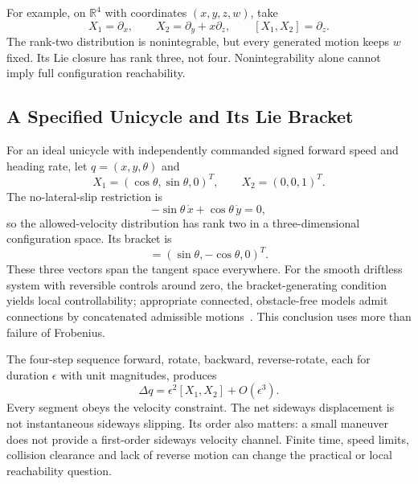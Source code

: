 For example, on $\mathbb R^4$ with coordinates $(x,y,z,w)$, take
\begin{equation}
 X_1=\partial_x,\qquad X_2=\partial_y+x\partial_z,
 \qquad[X_1,X_2]=\partial_z.
\end{equation}
The rank-two distribution is nonintegrable, but every generated motion keeps $w$ fixed. Its Lie closure has rank three, not four. Nonintegrability alone cannot imply full configuration reachability.

\subsection{A Specified Unicycle and Its Lie Bracket}

For an ideal unicycle with independently commanded signed forward speed and heading rate, let $q=(x,y,\theta)$ and
\begin{equation}
 X_1=(\cos\theta,\sin\theta,0)^T,\qquad X_2=(0,0,1)^T.
\end{equation}
The no-lateral-slip restriction is
\begin{equation}
 -\sin\theta\,\dot x+\cos\theta\,\dot y=0,
 \label{eq:car_constraint_frobenius}
\end{equation}
so the allowed-velocity distribution has rank two in a three-dimensional configuration space. Its bracket is
\begin{equation}
 [X_1,X_2]=(\sin\theta,-\cos\theta,0)^T.
\end{equation}
These three vectors span the tangent space everywhere. For the smooth driftless system with reversible controls around zero, the bracket-generating condition yields local controllability; appropriate connected, obstacle-free models admit connections by concatenated admissible motions~\cite{Murray1994,BulloLewis2004}. This conclusion uses more than failure of Frobenius.

The four-step sequence forward, rotate, backward, reverse-rotate, each for duration $\epsilon$ with unit magnitudes, produces
\begin{equation}
 \Delta q=\epsilon^2[X_1,X_2]+O(\epsilon^3).
\end{equation}
Every segment obeys the velocity constraint. The net sideways displacement is not instantaneous sideways slipping. Its order also matters: a small maneuver does not provide a first-order sideways velocity channel. Finite time, speed limits, collision clearance and lack of reverse motion can change the practical or local reachability question.

